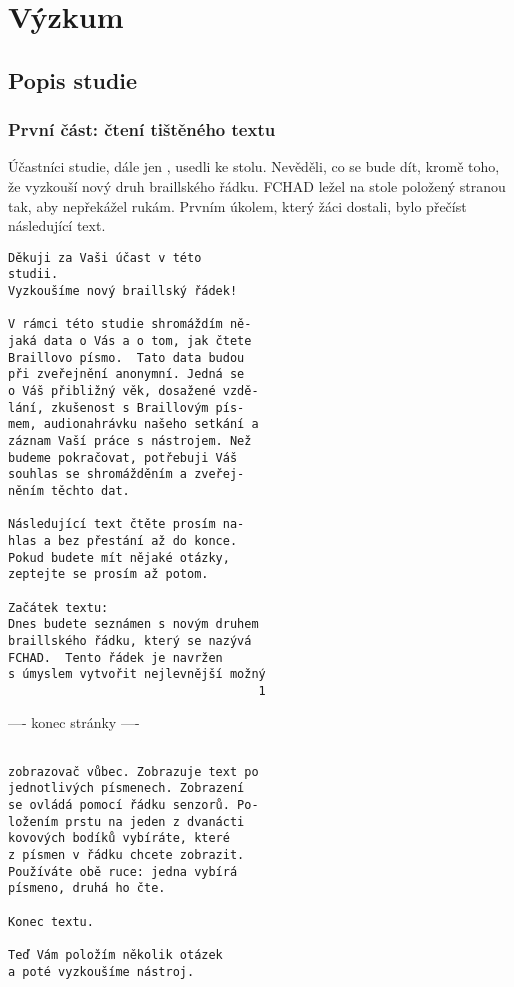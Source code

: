 \chapter{Výzkum}

\section{Popis studie}

\subsection{První část: čtení tištěného textu}

Účastníci studie, dále jen , usedli ke stolu.  Nevěděli, co se bude dít, kromě toho, že vyzkouší nový druh braillského řádku.  FCHAD ležel na stole položený stranou tak, aby nepřekážel rukám.  Prvním úkolem, který žáci dostali, bylo přečíst následující text.

\begin{verbatim}
Děkuji za Vaši účast v této
studii.
Vyzkoušíme nový braillský řádek!

V rámci této studie shromáždím ně-
jaká data o Vás a o tom, jak čtete
Braillovo písmo.  Tato data budou
při zveřejnění anonymní. Jedná se
o Váš přibližný věk, dosažené vzdě-
lání, zkušenost s Braillovým pís-
mem, audionahrávku našeho setkání a
záznam Vaší práce s nástrojem. Než
budeme pokračovat, potřebuji Váš
souhlas se shromážděním a zveřej-
něním těchto dat.

Následující text čtěte prosím na-
hlas a bez přestání až do konce.
Pokud budete mít nějaké otázky,
zeptejte se prosím až potom.

Začátek textu:
Dnes budete seznámen s novým druhem
braillského řádku, který se nazývá
FCHAD.  Tento řádek je navržen
s úmyslem vytvořit nejlevnější možný
                                   1
\end{verbatim}
---- konec stránky ----
\begin{verbatim}

zobrazovač vůbec. Zobrazuje text po
jednotlivých písmenech. Zobrazení
se ovládá pomocí řádku senzorů. Po-
ložením prstu na jeden z dvanácti
kovových bodíků vybíráte, které
z písmen v řádku chcete zobrazit.
Používáte obě ruce: jedna vybírá
písmeno, druhá ho čte.

Konec textu.

Teď Vám položím několik otázek
a poté vyzkoušíme nástroj.

\end{verbatim}

